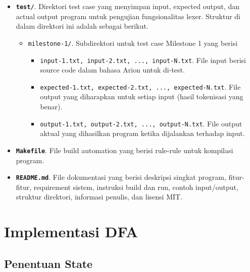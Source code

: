 \begin{itemize}
    \item \textbf{\texttt{test/}}. Direktori test case yang menyimpan input, expected output, dan actual output program untuk pengujian fungsionalitas lexer. Struktur di dalam direktori ini adalah sebagai berikut.
          \begin{itemize}
              \item \texttt{milestone-1/}. Subdirektori untuk test case Milestone 1 yang berisi
                    \begin{itemize}
                        \item \texttt{input-1.txt, input-2.txt, ..., input-N.txt}. File input berisi source code dalam bahasa Arion untuk di-test.
                        \item \texttt{expected-1.txt, expected-2.txt, ..., expected-N.txt}. File output yang diharapkan untuk setiap input (hasil tokenisasi yang benar).
                        \item \texttt{output-1.txt, output-2.txt, ..., output-N.txt}. File output aktual yang dihasilkan program ketika dijalankan terhadap input.
                    \end{itemize}
          \end{itemize}

    \item \textbf{\texttt{Makefile}}. File build automation yang berisi rule-rule untuk kompilasi program.

    \item \textbf{\texttt{README.md}}. File dokumentasi yang berisi deskripsi singkat program, fitur-fitur, requirement sistem, instruksi build dan run, contoh input/output, struktur direktori, informasi penulis, dan lisensi MIT.
\end{itemize}

\section{Implementasi DFA}
\subsection{Penentuan State}

